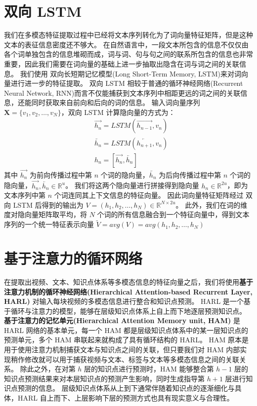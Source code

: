 \section{双向 LSTM}
    我们在多模态特征提取过程中已经将文本序列转化为了词向量特征矩阵，但是这种文本的表征信息密度还不够大。
    在自然语言中，一段文本所包含的信息不仅仅由各个词单独包含的信息堆砌而成，词与词、句与句之间的联系所包含的信息也非常重要，因此我们需要在词向量的基础上进一步抽取出隐含在词与词之间的关联信息。
    我们使用 双向长短期记忆模型(Long Short-Term Memory, LSTM)\cite{Hochreiter1997LongSM}来对词向量进行进一步的特征提取。
    双向 LSTM 相较于普通的循环神经网络(Recurrent Neural Network, RNN)而言不仅能捕获到文本序列中相距更远的词之间的关联信息，还能同时获取来自前向和后向的词的信息。
    输入词向量序列 $\boldsymbol{X} = \{v_1, v_2, \dots, v_N\}$，双向 LSTM 计算隐向量的方式为：
    \begin{equation}
        \begin{aligned}
            &\overrightarrow{h_{n}} = LSTM\left(\overrightarrow{h_{n - 1}}, v_n\right) \\
            &\overleftarrow{h_{n}} = LSTM\left(\overleftarrow{h_{n + 1}}, v_n\right) \\
            &h_n = \left[\overrightarrow{h_n}, \overleftarrow{h_n}\right]
        \end{aligned}
    \end{equation}
    其中 $\overrightarrow{h_{n}}$ 为前向传播过程中第 $n$ 个词的隐向量，$\overleftarrow{h_{n}}$ 为后向传播过程中第 $n$ 个词的隐向量，$\overrightarrow{h_{n}}, \overleftarrow{h_{n}} \in \mathbb{R}^{u}$。
    我们将这两个隐向量进行拼接得到隐向量 $h_n \in \mathbb{R}^{2u}$，即为文本序列中第 $n$ 个词连同其上下文信息的特征向量。
    因此词向量特征矩阵经过 双向 LSTM 后得到的输出为 $V = (h_1, h_2, \dots, h_N) \in \mathbb{R}^{N \times 2u}$。
    此外，我们在词的维度对隐向量矩阵取平均，将 $N$ 个词的所有信息融合到一个特征向量中，得到文本序列的一个统一特征表示向量 $\tilde{V} = avg(V) = avg(h_1, h_2, \dots, h_N)$


\section{基于注意力的循环网络}
    在提取出视频、文本、知识点体系等多模态信息的特征向量之后，我们将使用\textbf{基于注意力机制的循环神经网络(Hierarchical Attention-based Recurrent Layer, HARL)}\cite{Huang2019HierarchicalMT} 对输入每块视频的多模态信息进行整合和知识点预测。
    HARL 是一个基于循环与注意力的模型，能够在层级知识点体系上自上而下地逐层预测知识点。
    \textbf{基于注意力的记忆单元(Hierarchical Attention Memory unit, HAM)} 是 HARL 网络的基本单元，每一个 HAM 都是层级知识点体系中的某一层知识点的预测单元，多个 HAM 串联起来就构成了具有循环结构的 HARL。
    HAM 原本是用于使用注意力机制捕获文本与知识点之间的关联，但只要我们对 HAM 内部实现稍作修改就可以用于捕获视频与文本、标签与文本等多模态信息之间的关联关系。
    除此之外，在对第 $h$ 层的知识点进行预测时，HAM 能够整合第 $h - 1$ 层的知识点预测结果来对本层知识点的预测产生影响，同时生成指导第 $h + 1$ 层进行知识点预测的信息。
    层级知识点体系从上到下通常伴随着知识点的逐渐细化与具体，HARL 自上而下、上层影响下层的预测方式也具有现实意义与合理性。

